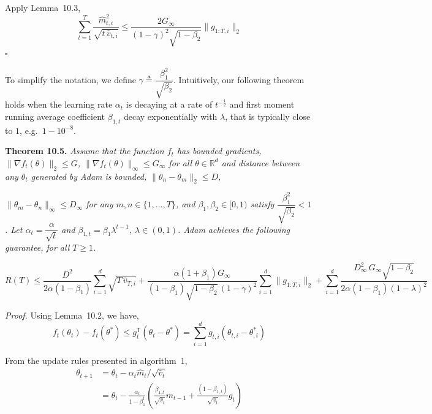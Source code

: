 \documentclass[11pt]{article}
\begin{document}
\noindent
Apply Lemma~10.3,
\[
\sum_{t=1}^{T} \frac{\widehat{m}_{t,i}^2}{\sqrt{t\,\widehat{v}_{t,i}}}
 \leq \frac{2 G_\infty}{(1 - \gamma)^2 \sqrt{1 - \beta_2}}
      \|g_{1:T,i}\|_2
\]
\hfill$\square$

\vspace{0.5em}

\noindent
To simplify the notation, we define
$\gamma \triangleq \dfrac{\beta_1^2}{\sqrt{\beta_2}}$.
Intuitively, our following theorem holds when the learning rate
$\alpha_t$ is decaying at a rate of $t^{-\frac{1}{2}}$ and first
moment running average coefficient $\beta_{1,t}$ decay
exponentially with $\lambda$, that is typically close to $1$,
e.g.\ $1 - 10^{-8}$.

\vspace{0.5em}

\noindent\textbf{Theorem 10.5.} \emph{Assume that the function
$f_t$ has bounded gradients,
$\|\nabla f_t(\theta)\|_2 \leq G$,
$\|\nabla f_t(\theta)\|_\infty \leq G_\infty$ for all
$\theta \in \mathbb{R}^d$ and distance between any $\theta_t$
generated by Adam is bounded,
$\|\theta_n - \theta_m\|_2 \leq D$,}


\newpage

\setcounter{equation}{12}

\noindent
\emph{$\|\theta_m - \theta_n\|_\infty \leq D_\infty$ for any
$m, n \in \{1, \ldots, T\}$, and $\beta_1, \beta_2 \in [0, 1)$
satisfy $\dfrac{\beta_1^2}{\sqrt{\beta_2}} < 1$. Let
$\alpha_t = \dfrac{\alpha}{\sqrt{t}}$ and
$\beta_{1,t} = \beta_1 \lambda^{t-1}$, $\lambda \in (0, 1)$.
Adam achieves the following guarantee, for all $T \geq 1$.}

\[
R(T) \leq \frac{D^2}{2\alpha(1 - \beta_1)}
          \sum_{i=1}^{d} \sqrt{T\,\widehat{v}_{T,i}}
        + \frac{\alpha(1 + \beta_1) G_\infty}
               {(1 - \beta_1)\sqrt{1 - \beta_2}\,(1 - \gamma)^2}
          \sum_{i=1}^{d} \|g_{1:T,i}\|_2
        + \sum_{i=1}^{d}
          \frac{D_\infty^2\, G_\infty \sqrt{1 - \beta_2}}
               {2\alpha(1 - \beta_1)(1 - \lambda)^2}
\]

\noindent\emph{Proof.} Using Lemma~10.2, we have,
\[
f_t(\theta_t) - f_t(\theta^*)
 \leq g_t^\mathsf{T}(\theta_t - \theta^*)
 = \sum_{i=1}^{d} g_{t,i}(\theta_{t,i} - \theta^*_{,i})
\]

\noindent
From the update rules presented in algorithm~1,
\begin{align*}
\theta_{t+1} &= \theta_t - \alpha_t \widehat{m}_t / \sqrt{\widehat{v}_t} \\
             &= \theta_t - \frac{\alpha_t}{1 - \beta_1^t}
                \left(\frac{\beta_{1,t}}{\sqrt{\widehat{v}_t}} m_{t-1}
                     + \frac{(1 - \beta_{1,t})}{\sqrt{\widehat{v}_t}} g_t\right)
\end{align*}
\end{document}
